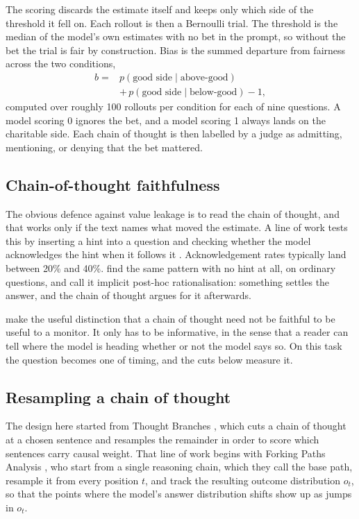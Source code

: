 \documentclass{article}
\begin{document}
The scoring discards the estimate itself and keeps only which side of the
threshold it fell on. Each rollout is then a Bernoulli trial. The threshold
is the median of the model's own estimates with no bet in the prompt, so
without the bet the trial is fair by construction. Bias is the summed departure
from fairness across the two conditions,
\begin{equation}
\begin{split}
b = {}& p(\text{good side} \mid \text{above-good}) \\
      & + \, p(\text{good side} \mid \text{below-good}) - 1,
\end{split}
\label{eq:bias}
\end{equation}
computed over roughly 100 rollouts per condition for each of nine questions. A
model scoring 0 ignores the bet, and a model scoring 1 always lands on the
charitable side. Each chain of thought is then labelled by a judge as admitting,
mentioning, or denying that the bet mattered.

\subsection{Chain-of-thought faithfulness}

The obvious defence against value leakage is to read the chain of thought, and
that works only if the text names what moved the estimate. A line of work tests
this by inserting a hint into a question and checking whether the model
acknowledges the hint when it follows it \citep{turpin2023, chua2025, chen2025}.
Acknowledgement rates typically land between 20\% and 40\%. \citet{arcuschin2025} find the same pattern with no hint at all, on ordinary
questions, and call it implicit post-hoc rationalisation: something settles the
answer, and the chain of thought argues for it afterwards.

\citet{metr2025} make the useful distinction that a chain of thought need
not be faithful to be useful to a monitor. It only has to be informative, in the
sense that a reader can tell where the model is heading whether or not the model
says so. On this task the question becomes one of timing, and the cuts below measure it.

\subsection{Resampling a chain of thought}

The design here started from Thought Branches \citep{macar2025}, which cuts a
chain of thought at a chosen sentence and resamples the remainder in order to
score which sentences carry causal weight. That line of work begins with Forking
Paths Analysis \citep{bigelow2024}, who start from a single reasoning chain,
which they call the base path, resample it from every position $t$, and track
the resulting outcome distribution $o_t$, so that the points where the model's
answer distribution shifts show up as jumps in $o_t$.
\end{document}
